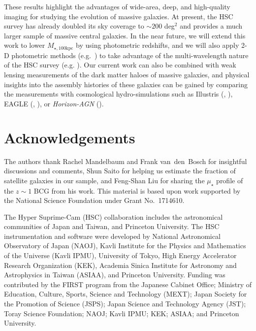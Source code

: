\documentclass[fleqn,usenatbib]{mnras}
\def\mtot{{$M_{\star,100\mathrm{kpc}}$}}
\def\mden{{$\mu_{\star}$}}
\begin{document}
    These results highlight the advantages of wide-area, deep, and high-quality imaging 
    for studying the evolution of massive galaxies. 
    At present, the HSC survey has already doubled its sky coverage to 
    ${\sim} 200$ deg$^2$ and provides a much larger sample of massive central galaxies. 
    In the near future, we will extend this work to lower \mtot{} by using photometric 
    redshifts, and we will also apply 2-D photometric methods 
    (e.g.\ \citealt{Huang2013a}) to take advantage of the multi-wavelength nature of 
    the HSC survey (e.g. \citealt{Huang2016}). 
    Our current work can also be combined with weak lensing measurements of the dark 
    matter haloes of massive galaxies, and physical insights into the assembly histories 
    of these galaxies can be gained by comparing the measurements with cosmological 
    hydro-simulations such as Illustris (\citealt{Vogelsberger2014}, 
    \citealt{Genel2014}), EAGLE (\citealt{Schaye2015}, \citealt{Crain2015}), 
    or \textit{Horizon-AGN} (\citealt{Dubois2014}).

  
\section*{Acknowledgements}

  The authors thank Rachel Mandelbaum and Frank van~den~Bosch for insightful 
  discussions and comments,
  Shun Saito for helping us estimate the fraction of satellite 
  galaxies in our sample, and
  Feng-Shan Liu for sharing the \mden{} profile of the $z\sim1$ BCG from 
  his work.
  This material is based upon work supported by the National Science Foundation under 
  Grant No.~1714610.
  
  The Hyper Suprime-Cam (HSC) collaboration includes the astronomical communities of 
  Japan and Taiwan, and Princeton University.  The HSC instrumentation and software 
  were developed by  National Astronomical Observatory of Japan (NAOJ), Kavli 
  Institute for the Physics and Mathematics of the Universe (Kavli IPMU), University 
  of Tokyo, High Energy Accelerator Research Organization (KEK), Academia Sinica 
  Institute for Astronomy and Astrophysics in Taiwan (ASIAA), and Princeton 
  University.  
  Funding was contributed by the FIRST program from the Japanese Cabinet Office;  
  Ministry of Education, Culture, Sports, Science and Technology (MEXT);  
  Japan Society for the Promotion of Science (JSPS); 
  Japan Science and Technology Agency (JST); 
  Toray Science Foundation; NAOJ; Kavli IPMU; KEK; ASIAA; and Princeton University. 
   
\end{document}
